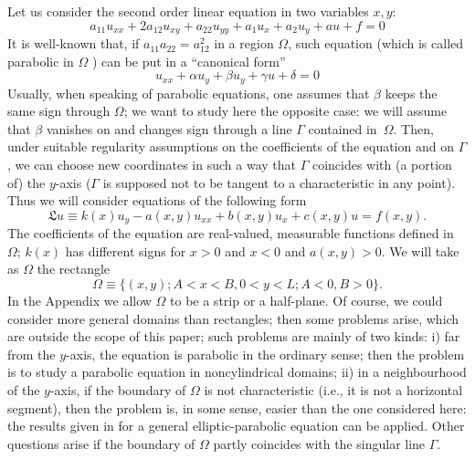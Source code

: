 \documentclass[a4paper,12pt,leqno]{article}
\numberwithin{equation}{section}
\begin{document}
Let us consider the second order linear equation in two variables $x, y$:
\begin{equation*}
	a_{11} u_{x x}+2 a_{12} u_{x y}+a_{22} u_{y y}+a_{1} u_{x}+a_{2} u_{y}+a u+f=0
\end{equation*}
It is well-known that, if $a_{11} a_{22}=a_{12}^{2}$ in a region $\Omega$, such equation (which is called parabolic in $\Omega$ ) can be put in a ``canonical form''
\begin{equation*}
	u_{xx}+\alpha u_{y}+\beta u_{y}+\gamma u+\delta=0
\end{equation*}
Usually, when speaking of parabolic equations, one assumes that $\beta$ keeps the same sign through $\Omega$; we want to study here the opposite case: we will assume that $\beta$ vanishes on and changes sign through a line $\Gamma$ contained in~$\Omega$. Then, under suitable regularity assumptions on the coefficients of the equation and on $\Gamma$, we can choose new coordinates in such a way that $\Gamma$ coincides with (a portion of) the $y$-axis ($\Gamma$ is supposed not to be tangent to a characteristic in any point).
Thus we will consider equations of the following form
\begin{equation} \label{1.1}
	\mathfrak{L}u \equiv k(x) u_{y}-a(x, y) u_{xx}+b(x, y) u_{x}+c(x, y) u=f(x, y).
\end{equation}
The coefficients of the equation are real-valued, measurable functions defined in $\Omega$; $k(x)$ has different signs for $x>0$ and $x<0$ and $a(x, y)>0$.
We will take as $\Omega$ the rectangle
\begin{equation*}
	\Omega \equiv\{(x, y); A<x<B, 0<y<L; A<0, B>0\}.
\end{equation*}
In the Appendix we allow $\Omega$ to be a strip or a half-plane. Of course, we could consider more general domains than rectangles; then some problems arise, which are outside the scope of this paper; such problems are mainly of two kinds: i) far from the $y$-axis, the equation is parabolic in the ordinary sense; then the problem is to study a parabolic equation in noncylindrical domains; ii) in a neighbourhood of the $y$-axis, if the boundary of $\Omega$ is not characteristic (i.e., it is not a horizontal segment), then the problem is, in some sense, easier than the one considered here: the results given in \cite{zbMATH03245768} for a general elliptic-parabolic equation can be applied. Other questions arise if the boundary of $\Omega$ partly coincides with the singular line $\Gamma$.
\end{document}
